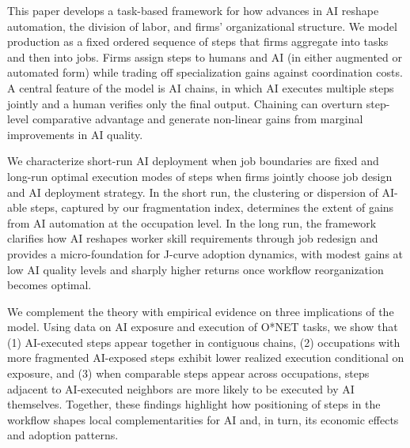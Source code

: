 This paper develops a task-based framework for how advances in AI reshape automation, the division of labor, and firms' organizational structure. 
We model production as a fixed ordered sequence of steps that firms aggregate into tasks and then into jobs. 
Firms assign steps to humans and AI (in either augmented or automated form) while trading off specialization gains against coordination costs. 
A central feature of the model is AI chains, in which AI executes multiple steps jointly and a human verifies only the final output. 
Chaining can overturn step-level comparative advantage and generate non-linear gains from marginal improvements in AI quality. 

We characterize short-run AI deployment when job boundaries are fixed and long-run optimal execution modes of steps when firms jointly choose job design and AI deployment strategy. 
In the short run, the clustering or dispersion of AI-able steps, captured by our fragmentation index, determines the extent of gains from AI automation at the occupation level. 
In the long run, the framework clarifies how AI reshapes worker skill requirements through job redesign and provides a micro-foundation for J-curve adoption dynamics, with modest gains at low AI quality levels and sharply higher returns once workflow reorganization becomes optimal. 

We complement the theory with empirical evidence on three implications of the model. 
Using data on AI exposure and execution of O*NET tasks, we show that (1) AI-executed steps appear together in contiguous chains, (2) occupations with more fragmented AI-exposed steps exhibit lower realized execution conditional on exposure, and (3) when comparable steps appear across occupations, steps adjacent to AI-executed neighbors are more likely to be executed by AI themselves. 
Together, these findings highlight how positioning of steps in the workflow shapes local complementarities for AI and, in turn, its economic effects and adoption patterns. 